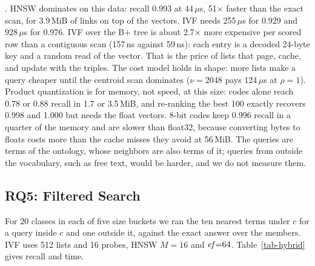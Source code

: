 .
HNSW dominates on this data: recall 0.993 at 44\,$\mu$s, 51$\times$ faster
than the exact scan, for 3.9\,MiB of links on top of the vectors.
IVF needs 255\,$\mu$s for 0.929 and 928\,$\mu$s for 0.976.
IVF over the B+ tree is about 2.7$\times$ more expensive per scored row than a
contiguous scan (157\,ns against 59\,ns): each entry is a decoded 24-byte key
and a random read of the vector.
That is the price of lists that page, cache, and update with the triples.
The cost model holds in shape: more lists make a query cheaper until the
centroid scan dominates ($\nu{=}2048$ pays 124\,$\mu$s at $\rho{=}1$).
Product quantization is for memory, not speed, at this size: codes alone
reach 0.78 or 0.88 recall in 1.7 or 3.5\,MiB, and re-ranking the best 100
exactly recovers 0.998 and 1.000 but needs the float vectors.
8-bit codes keep 0.996 recall in a quarter of the memory and are slower than
float32, because converting bytes to floats costs more than the cache misses
they avoid at 56\,MiB.
The queries are terms of the ontology, whose neighbors are also terms of it;
queries from outside the vocabulary, such as free text, would be harder, and
we do not measure them.

\subsection{RQ5: Filtered Search}

For 20 classes in each of five size buckets we ran the ten nearest terms
under $c$ for a query inside $c$ and one outside it, against the exact answer
over the members.
IVF uses 512 lists and 16 probes, HNSW $M{=}16$ and $\mathit{ef}{=}64$.
Table~\ref{tab-hybrid} gives recall and time.

